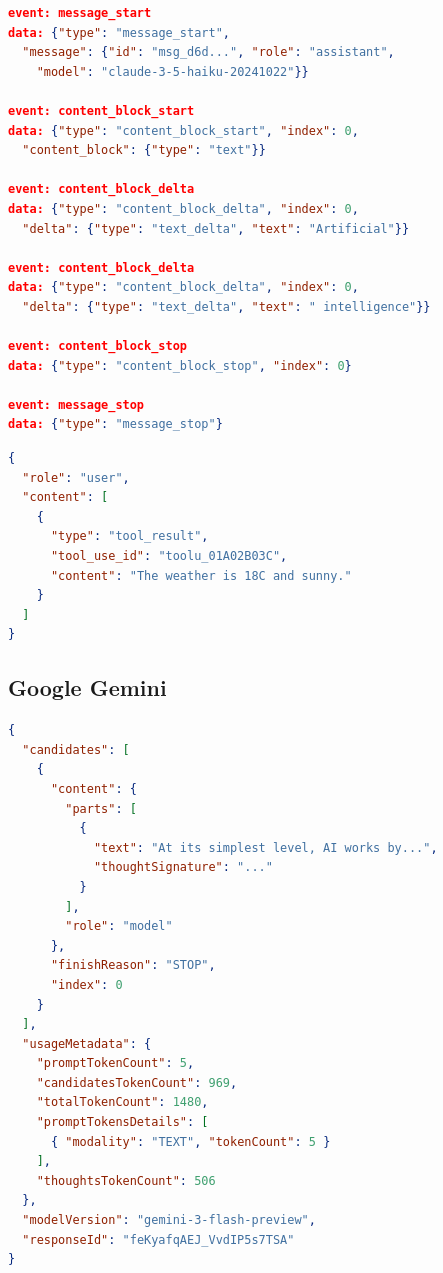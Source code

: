 \begin{lstlisting}[language=json, caption={Resposta \textit{stream} da \textbf{Anthropic} (eventos \textbf{SSE})}]
event: message_start
data: {"type": "message_start",
  "message": {"id": "msg_d6d...", "role": "assistant",
    "model": "claude-3-5-haiku-20241022"}}

event: content_block_start
data: {"type": "content_block_start", "index": 0,
  "content_block": {"type": "text"}}

event: content_block_delta
data: {"type": "content_block_delta", "index": 0,
  "delta": {"type": "text_delta", "text": "Artificial"}}

event: content_block_delta
data: {"type": "content_block_delta", "index": 0,
  "delta": {"type": "text_delta", "text": " intelligence"}}

event: content_block_stop
data: {"type": "content_block_stop", "index": 0}

event: message_stop
data: {"type": "message_stop"}
\end{lstlisting}

\begin{lstlisting}[language=json, caption={Devolução de resultado de ferramenta na API da \textbf{Anthropic}}]
{
  "role": "user",
  "content": [
    {
      "type": "tool_result",
      "tool_use_id": "toolu_01A02B03C",
      "content": "The weather is 18C and sunny."
    }
  ]
}
\end{lstlisting}

\subsection{\textbf{Google Gemini}}

\begin{lstlisting}[language=json, caption={Resposta completa da API do \textbf{Gemini} (geração básica)}]
{
  "candidates": [
    {
      "content": {
        "parts": [
          {
            "text": "At its simplest level, AI works by...",
            "thoughtSignature": "..."
          }
        ],
        "role": "model"
      },
      "finishReason": "STOP",
      "index": 0
    }
  ],
  "usageMetadata": {
    "promptTokenCount": 5,
    "candidatesTokenCount": 969,
    "totalTokenCount": 1480,
    "promptTokensDetails": [
      { "modality": "TEXT", "tokenCount": 5 }
    ],
    "thoughtsTokenCount": 506
  },
  "modelVersion": "gemini-3-flash-preview",
  "responseId": "feKyafqAEJ_VvdIP5s7TSA"
}
\end{lstlisting}

